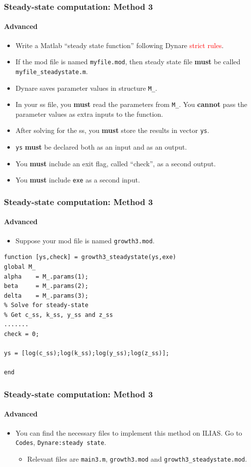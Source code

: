 \documentclass{beamer}
\begin{document}
\begin{frame}[fragile]
\frametitle{Steady-state computation: Method 3}
\framesubtitle{Advanced}
\small 

\begin{itemize}
	\item Write a Matlab ``steady state function'' following Dynare \textcolor{red}{strict rules}.
	\item If the mod file is named \texttt{myfile.mod}, then steady state file \textbf{must} be called \texttt{myfile\_steadystate.m}.
	\item Dynare saves parameter values in structure \texttt{M\_}.
	\item In your ss file, you \textbf{must} read the parameters from \texttt{M\_}. You \textbf{cannot} pass the parameter values as extra inputs to the function.
	\item After solving for the ss, you \textbf{must} store the results in vector \texttt{ys}. 
	\item \texttt{ys} \textbf{must} be declared both as an input and as an output.
	\item You \textbf{must} include an exit flag, called ``check'', as a second output.
	\item You \textbf{must} include \texttt{exe} as a second input.
\end{itemize}

\end{frame}

\begin{frame}[fragile]
\frametitle{Steady-state computation: Method 3}
\framesubtitle{Advanced}
\small 
\begin{itemize}
	\item Suppose your mod file is named \texttt{growth3.mod}.
\end{itemize}
\begin{verbatim}
function [ys,check] = growth3_steadystate(ys,exe)
global M_
alpha    = M_.params(1);  
beta     = M_.params(2);  
delta    = M_.params(3); 
% Solve for steady-state
% Get c_ss, k_ss, y_ss and z_ss
.......
check = 0;

ys = [log(c_ss);log(k_ss);log(y_ss);log(z_ss)];

end
\end{verbatim}
\end{frame}

\begin{frame}[fragile]
\frametitle{Steady-state computation: Method 3}
\framesubtitle{Advanced}
\small 
\begin{itemize}
	\item You can find the necessary files to implement this method on ILIAS. Go to \texttt{Codes}, \texttt{Dynare:steady state}.
	\begin{itemize}
		\item Relevant files are \texttt{main3.m}, \texttt{growth3.mod} and \texttt{growth3\_steadystate.mod}.
	\end{itemize}
\end{itemize}
\end{frame}
\end{document}
